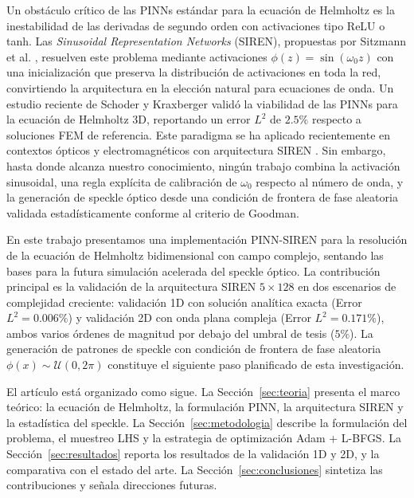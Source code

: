 Un obstáculo crítico de las PINNs estándar para la ecuación de Helmholtz es la inestabilidad
de las derivadas de segundo orden con activaciones tipo ReLU o tanh.
Las \textit{Sinusoidal Representation Networks} (SIREN), propuestas por
Sitzmann et al. \cite{Sitzmann2020_SIREN}, resuelven este problema mediante activaciones
$\phi(z) = \sin(\omega_0 z)$ con una inicialización que preserva la distribución de
activaciones en toda la red, convirtiendo la arquitectura en la elección natural para
ecuaciones de onda.
Un estudio reciente de Schoder y Kraxberger \cite{Schoder2024_PINN_acoustics} validó la
viabilidad de las PINNs para la ecuación de Helmholtz 3D, reportando un error $L^2$ de
$2.5\%$ respecto a soluciones FEM de referencia.
Este paradigma se ha aplicado recientemente en contextos ópticos y electromagnéticos con
arquitectura SIREN \cite{Panagiotakopoulos2026_Helmholtz}. Sin embargo, hasta donde alcanza
nuestro conocimiento, ningún trabajo combina la activación sinusoidal, una regla explícita de
calibración de $\omega_0$ respecto al número de onda, y la generación de speckle óptico desde
una condición de frontera de fase aleatoria validada estadísticamente conforme al criterio de
Goodman.

En este trabajo presentamos una implementación PINN-SIREN para la resolución de la ecuación
de Helmholtz bidimensional con campo complejo, sentando las bases para la futura simulación
acelerada del speckle óptico.
La contribución principal es la validación de la arquitectura SIREN $5\times128$ en dos
escenarios de complejidad creciente: validación 1D con solución analítica exacta
(Error $L^2 = 0.006\%$) y validación 2D con onda plana compleja (Error $L^2 = 0.171\%$),
ambos varios órdenes de magnitud por debajo del umbral de tesis ($5\%$).
La generación de patrones de speckle con condición de frontera de fase aleatoria
$\phi(x) \sim \mathcal{U}(0, 2\pi)$ constituye el siguiente paso planificado de esta investigación.

El artículo está organizado como sigue.
La Sección~\ref{sec:teoria} presenta el marco teórico: la ecuación de Helmholtz, la formulación
PINN, la arquitectura SIREN y la estadística del speckle.
La Sección~\ref{sec:metodologia} describe la formulación del problema, el muestreo LHS y la
estrategia de optimización Adam + L-BFGS.
La Sección~\ref{sec:resultados} reporta los resultados de la validación 1D y 2D, y la comparativa
con el estado del arte.
La Sección~\ref{sec:conclusiones} sintetiza las contribuciones y señala direcciones futuras.
